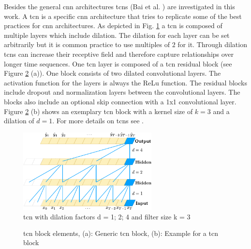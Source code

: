 \documentclass[conference]{IEEEtran}
\begin{document}
Besides the general \gls{cnn} architectures \glspl{tcn} (Bai et al. \cite{Bai2018}) are investigated in this work. A \gls{tcn} is a specific \gls{cnn} architecture that tries to replicate some of the best practices for \gls{cnn} architectures. As depicted in Fig. \ref{fig:tcn_architecture} a \gls{tcn} is composed of multiple layers which include dilation. The dilation for each layer can be set arbitrarily but it is common practice to use multiples of $ 2 $ for it. Through dilation \glspl{tcn} can increase their receptive field and therefore capture relationships over longer time sequences. One \gls{tcn} layer is composed of a \gls{tcn} residual block (see Figure \ref{fig:tcn_block} (a)). One block consists of two dilated convolutional layers. The activation function for the layers is always the ReLu function. The residual blocks include dropout and normalization layers between the convolutional layers. The blocks also include an optional skip connection with a 1x1 convolutional layer. Figure \ref{fig:tcn_block} (b) shows an exemplary \gls{tcn} block with a kernel size of $ k = 3 $ and a dilation of $ d = 1 $. For more details on \glspl{tcn} see \cite{Bai2018}.

\begin{figure}[htp]
	\centering
	\includegraphics[width=7cm]{tcn_architecture.pdf}
	\caption{\gls{tcn} with dilation factors d = 1; 2; 4 and filter size k = 3 \cite{Bai2018}}
	\label{fig:tcn_architecture}
\end{figure}

\begin{figure}[htp]
	\centering
	\quad
	\caption{\gls{tcn} block elements, (a): Generic \gls{tcn} block, (b): Example for a \gls{tcn} block \cite{Bai2018}}
	\label{fig:tcn_block}
\end{figure}
\end{document}
